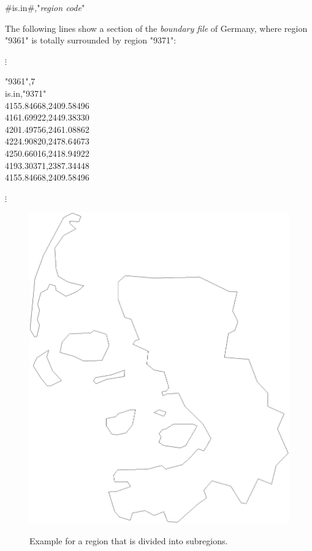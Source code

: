 #is.in#,"{\em region code}"

The following lines show a section of the {\em boundary file} of
Germany, where region "9361" is totally
surrounded by region "9371":

\footnotesize

\hspace{1cm} $\vdots$

"9361",7 \\
is.in,"9371" \\
4155.84668,2409.58496 \\
4161.69922,2449.38330 \\
4201.49756,2461.08862 \\
4224.90820,2478.64673 \\
4250.66016,2418.94922 \\
4193.30371,2387.34448 \\
4155.84668,2409.58496

\hspace{1cm} $\vdots$

\normalsize

\begin{figure}[hb]
\centering
\includegraphics [scale=0.3]{grafiken/reg1054.eps}
{\em\caption{\label{westsub} Example for a region that is divided
into subregions.}}
\end{figure}

